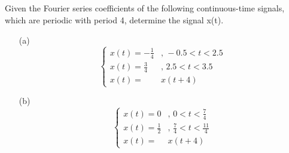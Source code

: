 \documentclass{article}
\begin{document}
    \subsection{} Given the Fourier series coefficients of the following continuous-time signals, which are periodic with period 4, determine the signal x(t).
    \begin{enumerate}
        \item[(a)] 
        \begin{equation*}
            \left\{\begin{array}{rl}
                 x(t)=-\frac{1}{4}&\textrm{, } -0.5 < t < 2.5  \\
                x(t)=\frac{3}{4}&\textrm{, } 2.5 < t < 3.5  \\
                x(t)= &x(t+4)
            \end{array}\right.
        \end{equation*}
        \item[(b)] 
        \begin{equation*}
            \left\{\begin{array}{rl}
                 x(t)=0&\textrm{, } 0 < t < \frac{7}{4}  \\
                x(t)=\frac{1}{2}&\textrm{, } \frac{7}{4} < t < \frac{11}{4}   \\
                x(t)= &x(t+4)
            \end{array}\right.
        \end{equation*}
    \end{enumerate}
\end{document}
